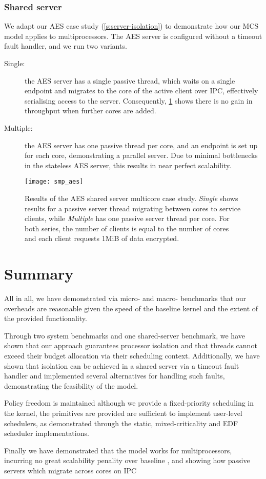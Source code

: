 \subsubsection{Shared server}

We adapt our \gls{AES} case study (\cref{s:server-isolation}) to demonstrate how our MCS model 
applies to multiprocessors. The AES server is configured without a timeout fault handler, and
we run two variants. 

\begin{description}
    \item[Single:] the AES server has a single passive thread, which waits on a single endpoint
        and migrates to the core of the active client over IPC, effectively serialising access to the server.
        Consequently, \cref{f:evaluation-smp-aes} shows there is no gain in throughput when further cores are
        added. 
    \item[Multiple:] the AES server has one passive thread per core, and an endpoint is set up for
        each core, demonstrating a parallel server. Due to minimal bottlenecks in the stateless 
        AES server, this results in near perfect scalability.
\end{description}

\begin{figure}[ht] 
    \centering
    \texttt{[image: smp\_aes]}
    \caption{Results of the AES shared server multicore case study. \emph{Single} shows results for a 
        passive server thread migrating between cores to service clients, while \emph{Multiple} has one
        passive server thread per core. For both series, the number of clients is equal to the number of
        cores and each client requests 1MiB of data encrypted. }
    \label{f:evaluation-smp-aes}
\end{figure}

\section{Summary}

All in all, we have demonstrated via micro- and macro- benchmarks that our overheads are
reasonable given the speed of the baseline kernel and the extent of the provided
functionality. 

Through two system benchmarks and one shared-server benchmark, we have shown
that our approach guarantees processor isolation and that threads cannot exceed
their budget allocation via their scheduling context. Additionally, we have
shown that isolation can be achieved in a shared server via a timeout fault
handler and implemented several alternatives for handling such faults,
demonstrating the feasibility of the model. 

Policy freedom is maintained although we provide a fixed-priority scheduling in the kernel, the primitives are provided are sufficient to implement user-level schedulers, 
as demonstrated through the static, mixed-criticality and EDF scheduler
implementations. 

Finally we have demonstrated that the model works for multiprocessors,
incurring no great scalability penality over baseline \selfour, 
and showing how passive servers which migrate across cores on \gls{IPC}
